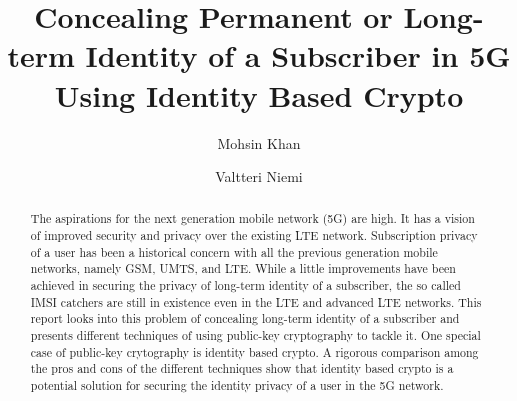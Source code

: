 \documentclass[lnicst,sechang,a4paper]{svmultln}
\begin{document}
\mainmatter  %

\title{Concealing Permanent or Long-term Identity of a Subscriber in 5G Using Identity Based Crypto}


%
%
\author{Mohsin Khan%
\and Valtteri Niemi}  %


%
%

\maketitle


\begin{abstract}
The aspirations for the next generation mobile network (5G) are high. It has a vision of improved security and privacy over the existing LTE network. Subscription privacy of a user has been a historical concern with all the previous generation mobile networks, namely GSM, UMTS, and LTE. While a little improvements have been achieved in securing the privacy of long-term identity of a subscriber, the so called IMSI catchers are still in existence even in the LTE and advanced LTE networks. This report looks into this problem of concealing long-term identity of a subscriber and presents different techniques of using public-key cryptography to tackle it. One special case of public-key crytography is identity based crypto. A rigorous comparison among the pros and cons of the different techniques show that identity based crypto is a potential solution for securing the identity privacy of a user in the 5G network.
\end{abstract}
\end{document}
